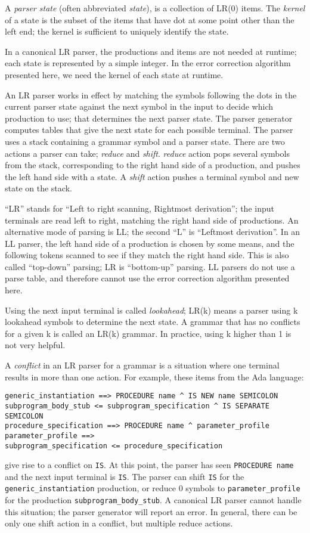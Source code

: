 \documentclass[authordraft]{acmart}
\begin{document}
A {\it parser state} (often abbreviated {\it state}), is a collection
of LR(0) items. The {\it kernel} of a state is the subset of the items
that have dot at some point other than the left end; the kernel is
sufficient to uniquely identify the state.

In a canonical LR parser, the productions and items are not needed at
runtime; each state is represented by a simple integer. In the error
correction algorithm presented here, we need the kernel of each state
at runtime.

An LR parser works in effect by matching the symbols following the
dots in the current parser state against the next symbol in the input
to decide which production to use; that determines the next parser
state. The parser generator computes tables that give the next state
for each possible terminal. The parser uses a stack containing a
grammar symbol and a parser state. There are two actions a parser can
take; {\it reduce} and {\it shift}. {\it reduce} action pops several
symbols from the stack, corresponding to the right hand side of a
production, and pushes the left hand side with a  state. A {\it
  shift} action pushes a terminal symbol and new state on the stack.

``LR'' stands for ``Left to right scanning, Rightmost derivation'';
the input terminals are read left to right, matching the right hand
side of productions. An alternative mode of parsing is LL; the second
``L'' is ``Leftmost derivation''. In an LL parser, the left hand side
of a production is chosen by some means, and the following tokens
scanned to see if they match the right hand side. This is also called
``top-down'' parsing; LR is ``bottom-up'' parsing. LL parsers do not
use a parse table, and therefore cannot use the error correction
algorithm presented here.

Using the next input terminal is called {\it lookahead}; LR(k) means a
parser using k lookahead symbols to determine the next state. A
grammar that has no conflicts for a given k is called an LR(k)
grammar. In practice, using k higher than 1 is not very helpful.

A {\it conflict} in an LR parser for a grammar is a situation where
one terminal results in more than one action. For example,
these items from the Ada language:
\begin{verbatim}
generic_instantiation ==> PROCEDURE name ^ IS NEW name SEMICOLON
subprogram_body_stub <= subprogram_specification ^ IS SEPARATE SEMICOLON
procedure_specification ==> PROCEDURE name ^ parameter_profile
parameter_profile ==>
subprogram_specification <= procedure_specification
\end{verbatim}
give rise to a conflict on \verb|IS|. At this point, the parser has
seen \verb|PROCEDURE name| and the next input terminal is \verb|IS|.
The parser can shift \verb|IS| for the \verb|generic_instantiation|
production, or reduce 0 symbols to \verb|parameter_profile| for the
production \verb|subprogram_body_stub|. A canonical LR parser cannot
handle this situation; the parser generator will report an error. In
general, there can be only one shift action in a conflict, but
multiple reduce actions.
\end{document}
